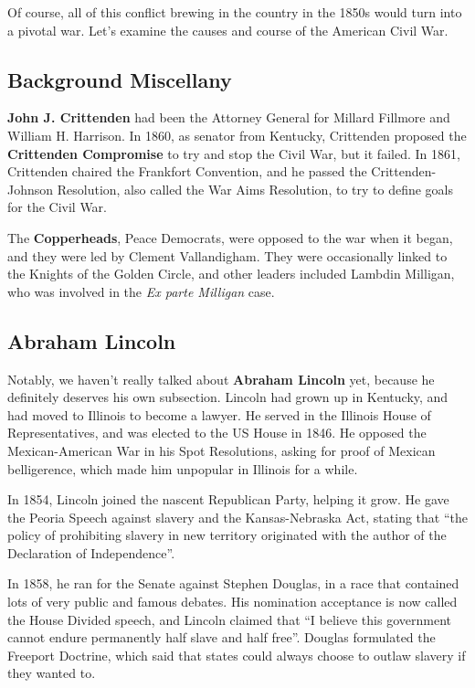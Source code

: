 Of course, all of this conflict brewing in the country in the 1850s would turn into a pivotal war.
Let's examine the causes and course of the American Civil War.

\subsection*{Background Miscellany}

\textbf{John J. Crittenden} had been the Attorney General for Millard Fillmore and William H. Harrison.
In 1860, as senator from Kentucky, Crittenden proposed the \textbf{Crittenden Compromise}
to try and stop the Civil War, but it failed.
In 1861, Crittenden chaired the Frankfort Convention,
and he passed the Crittenden-Johnson Resolution, also called the War Aims Resolution,
to try to define goals for the Civil War.

The \textbf{Copperheads}, Peace Democrats, were opposed to the war when it began,
and they were led by Clement Vallandigham.
They were occasionally linked to the Knights of the Golden Circle,
and other leaders included Lambdin Milligan, who was involved in the \textit{Ex parte Milligan} case.

\subsection*{Abraham Lincoln}

Notably, we haven't really talked about \textbf{Abraham Lincoln} yet,
because he definitely deserves his own subsection.
Lincoln had grown up in Kentucky, and had moved to Illinois to become a lawyer.
He served in the Illinois House of Representatives, and was elected to the US House in 1846.
He opposed the Mexican-American War in his Spot Resolutions, asking for proof of Mexican belligerence,
which made him unpopular in Illinois for a while.

In 1854, Lincoln joined the nascent Republican Party, helping it grow.
He gave the Peoria Speech against slavery and the Kansas-Nebraska Act, stating that
``the policy of prohibiting slavery in new territory originated with the author of the Declaration of Independence''.

In 1858, he ran for the Senate against Stephen Douglas,
in a race that contained lots of very public and famous debates.
His nomination acceptance is now called the House Divided speech, and Lincoln claimed that
``I believe this government cannot endure permanently half slave and half free''.
Douglas formulated the Freeport Doctrine,
which said that states could always choose to outlaw slavery if they wanted to.

